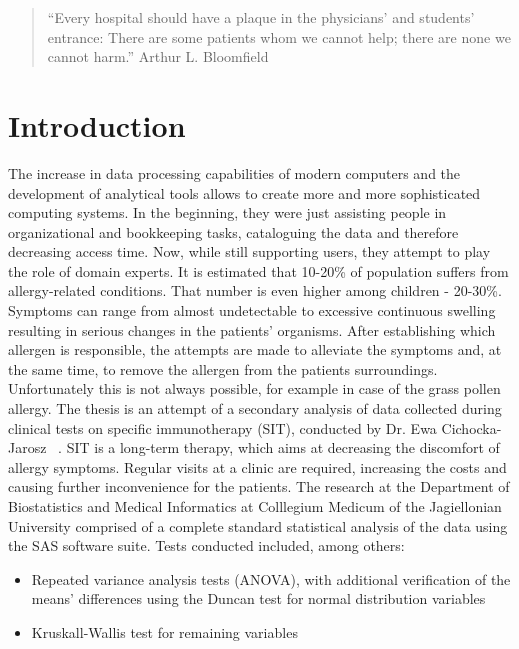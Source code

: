 \documentclass[10pt,oneside]{memoir}
\begin{document}
\begin{quotation}
``Every hospital should have a plaque in the physicians' and students' entrance: There are some patients whom we cannot help; there are none we cannot harm.''
Arthur L. Bloomfield
\end{quotation}

\part{Introduction}
\label{introduction}

The increase in data processing capabilities of modern computers and the development of analytical tools allows to create more and more sophisticated computing systems. In the beginning, they were just assisting people in organizational and bookkeeping tasks, cataloguing the data and therefore decreasing access time. Now, while still supporting users, they attempt to play the role of domain experts.
It is estimated that 10-20\% of population suffers from allergy-related conditions. That number is even higher among children - 20-30\%. Symptoms can range from almost undetectable to excessive continuous swelling resulting in serious changes in the patients' organisms.  After establishing which allergen is responsible, the attempts are made to alleviate the symptoms and, at the same time, to remove the allergen from the patients surroundings. Unfortunately this is not always possible, for example in case of the grass pollen allergy.
The thesis is an attempt of a secondary analysis of data collected during clinical tests on specific immunotherapy (SIT), conducted by Dr. Ewa Cichocka-Jarosz ~\cite{Cichocka-Jarosz:1997}. SIT is a long-term therapy, which aims at decreasing the discomfort of allergy symptoms. Regular visits at a clinic are required, increasing the costs and causing further inconvenience for the patients.
The research at the Department of Biostatistics and Medical Informatics at Colllegium Medicum of the Jagiellonian University comprised of a complete standard statistical analysis of the data using the SAS software suite. Tests conducted included, among others:


\begin{itemize}


\item Repeated variance analysis tests (ANOVA), with additional verification of the means' differences using the Duncan test for normal distribution variables

\item Kruskall-Wallis test for remaining variables ~\cite{Cichocka-Jarosz:1997}
\end{itemize}
\end{document}
